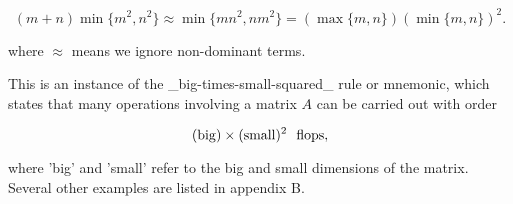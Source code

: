 \[(m+n)\min\{m^{2},n^{2}\}\approx\min\{mn^{2},nm^{2}\}=(\max\{m,n\})(\min\{m,n\} )^{2}.\]

where \(\approx\) means we ignore non-dominant terms.

This is an instance of the _big-times-small-squared_ rule or mnemonic, which states that many operations involving a matrix \(A\) can be carried out with order

\[({\rm big})\times({\rm small})^{2}\ \ {\rm flops},\]

where 'big' and 'small' refer to the big and small dimensions of the matrix. Several other examples are listed in appendix B.

 